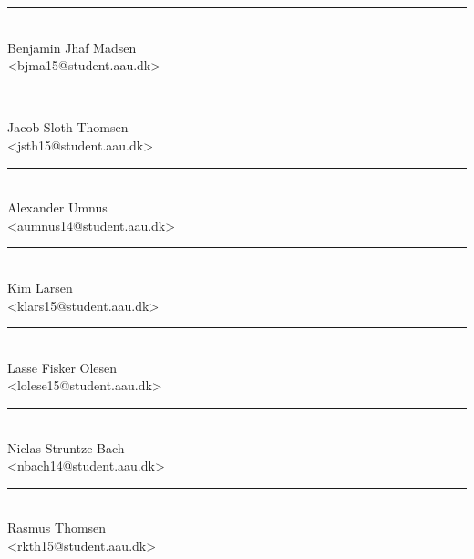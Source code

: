 \begin{minipage}[b]{0.45\textwidth}
 \centering
 \vspace{12pt}
 \rule{\textwidth}{0.5pt}\\
  Benjamin Jhaf Madsen\\
 {\footnotesize <bjma15@student.aau.dk>}\\
 \vspace{12pt}
 \centering
 \vspace{12pt}
 \rule{\textwidth}{0.5pt}\\
  Jacob Sloth Thomsen\\
 {\footnotesize <jsth15@student.aau.dk>}\\
 \vspace{12pt}
 \centering
 \vspace{12pt}
 \rule{\textwidth}{0.5pt}\\
  Alexander Umnus\\
 {\footnotesize <aumnus14@student.aau.dk>}\\
 \vspace{12pt}
\end{minipage}
\hfill
\begin{minipage}[b]{0.45\textwidth}
 \centering
 \vspace{12pt}
 \rule{\textwidth}{0.5pt}\\
  Kim Larsen\\
 {\footnotesize <klars15@student.aau.dk>}\\
 \vspace{12pt}
 \centering
 \vspace{12pt}
 \rule{\textwidth}{0.5pt}\\
  Lasse Fisker Olesen\\
 {\footnotesize <lolese15@student.aau.dk>}\\
 \vspace{12pt}
\centering
 \vspace{12pt}
 \rule{\textwidth}{0.5pt}\\
  Niclas Struntze Bach\\
 {\footnotesize <nbach14@student.aau.dk>}\\
 \vspace{12pt}
\end{minipage}%
\hfill
\begin{minipage}[b]{1.0\textwidth}
 \centering
 \vspace{12pt}
 \rule{\textwidth}{0.5pt}\\
  Rasmus Thomsen\\
 {\footnotesize <rkth15@student.aau.dk>}\\
 \vspace{12pt}
\end{minipage}%